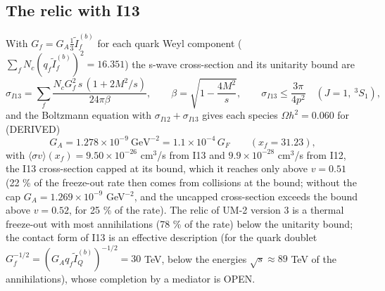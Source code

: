 \documentclass[
  10pt,
]{article}
\begin{document}
\hypertarget{the-relic-with-i13}{%
\subsection{The relic with I13}\label{the-relic-with-i13}}

With \(G_f = G_A\frac13\tilde I^{(b)}_f\) for each quark Weyl component
(\(\sum_fN_c(q_f\tilde I^{(b)}_f)^2 = 16.351\)) the s-wave cross-section
and its unitarity bound are
\[ \sigma_{I13} = \sum_f\frac{N_cG_f^2\,s\,(1 + 2M^2/s)}{24\pi\beta},\qquad \beta = \sqrt{1 - \frac{4M^2}{s}},\qquad \sigma_{I13} \le \frac{3\pi}{4p^2}\quad (J = 1,\ ^3S_1), \]
and the Boltzmann equation with \(\sigma_{I12} + \sigma_{I13}\) gives
each species \(\Omega h^2 = 0.060\) for (DERIVED)
\[ G_A = 1.278\times10^{-9}\ \text{GeV}^{-2} = 1.1\times10^{-4}\,G_F\qquad (x_f = 31.23), \]
with \(\langle\sigma v\rangle(x_f) = 9.50\times10^{-26}\) cm\(^3\)/s
from I13 and \(9.9\times10^{-28}\) cm\(^3\)/s from I12, the I13
cross-section capped at its bound, which it reaches only above
\(v = 0.51\) (22 \% of the freeze-out rate then comes from collisions at
the bound; without the cap \(G_A = 1.269\times10^{-9}\) GeV\(^{-2}\),
and the uncapped cross-section exceeds the bound above \(v = 0.52\), for
25 \% of the rate). The relic of UM-2 version 3 is a thermal freeze-out
with most annihilations (78 \% of the rate) below the unitarity bound;
the contact form of I13 is an effective description (for the quark
doublet \(G_f^{-1/2} = (G_Aq_f\tilde I^{(b)}_Q)^{-1/2} = 30\) TeV, below
the energies \(\sqrt s \approx 89\) TeV of the annihilations), whose
completion by a mediator is OPEN.
\end{document}
